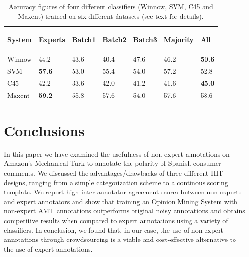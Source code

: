\documentclass[11pt,letterpaper]{article}
\begin{document}
\begin{table}
\begin{center}
\begin{small}
\begin{tabular}{|l|l|l|l|l|l|l|} \hline
 System & 
 {\begin{sideways}\parbox{2cm}{\centering Experts}\end{sideways}} &
 {\begin{sideways}\parbox{2cm}{\centering Batch1}\end{sideways}} &
 {\begin{sideways}\parbox{2cm}{\centering Batch2}\end{sideways}} &
 {\begin{sideways}\parbox{2cm}{\centering Batch3}\end{sideways}} &
 {\begin{sideways}\parbox{2cm}{\centering Majority}\end{sideways}} &
 {\begin{sideways}\parbox{2cm}{\centering All}\end{sideways}} \\ \hline
 Winnow & 44.2 & 43.6 & 40.4 & 47.6 & 46.2 & \textbf{50.6} \\ \hline
 SVM & \textbf{57.6} & 53.0 & 55.4 & 54.0 & 57.2 & 52.8 \\ \hline
 C45 & 42.2 & 33.6 & 42.0 & 41.2 & 41.6 & \textbf{45.0} \\ \hline
 Maxent & \textbf{59.2} & 55.8 & 57.6 & 54.0 & 57.6 & 58.6 \\ \hline
\end{tabular}
\end{small}
\end{center}
\caption{Accuracy figures of four different classifiers (Winnow, SVM, C45 and Maxent) trained on six different datasets (see text for details).}
\label{table:amtvsexp}
\end{table}

\section{Conclusions}
\label{sect:conclusions}
In this paper we have examined the usefulness of non-expert annotations on Amazon's Mechanical Turk to annotate the polarity of Spanish consumer comments. We discussed the advantages/drawbacks of three different HIT designs, ranging from a simple categorization scheme to a continous scoring template. We report high inter-annotator agreement scores between non-experts and expert annotators and show that training an Opinion Mining System with non-expert AMT annotations outperforms original noisy annotations and obtains competitive results when compared to expert annotations using a variety of classifiers. In conclusion, we found that, in our case, the use of non-expert annotations through crowdsourcing is a viable and cost-effective alternative to the use of expert annotations.
\end{document}
